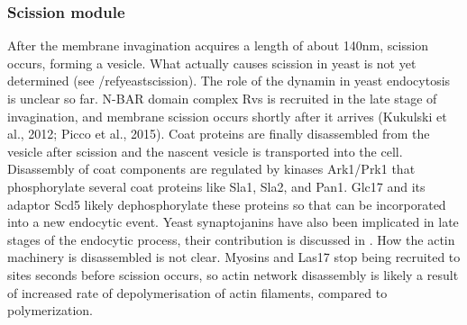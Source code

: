 			\subsubsection{Scission module}
After the membrane invagination acquires a length of about 140nm, scission occurs, forming a vesicle. What actually causes scission in yeast is not yet determined (see /ref{yeastscission}).
The role of the dynamin in yeast endocytosis is unclear so far. N-BAR domain complex Rvs is recruited in the late stage of invagination, and membrane scission occurs shortly after it arrives (Kukulski et al., 2012; Picco et al., 2015). 
Coat proteins are finally disassembled from the vesicle after scission and the nascent vesicle is transported into the cell. Disassembly of coat components are regulated by kinases Ark1/Prk1 that phosphorylate several coat proteins like Sla1, Sla2, and Pan1. Glc17 and its adaptor Scd5 likely dephosphorylate these proteins so that can be incorporated into a new endocytic event. Yeast synaptojanins have also been implicated in late stages of the endocytic process, their contribution is discussed in . How the actin machinery is disassembled is not clear. Myosins and Las17 stop being recruited to sites seconds before scission occurs, so actin network disassembly is likely a result of increased rate of depolymerisation of actin filaments, compared to polymerization. 




